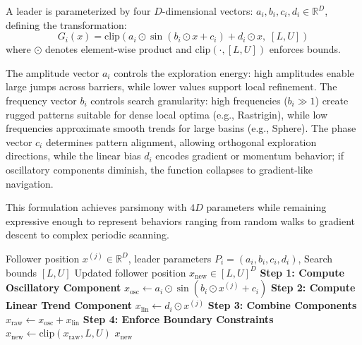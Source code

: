 \documentclass[11pt]{article}
\begin{document}
A leader is parameterized by four $D$-dimensional vectors: $a_i, b_i, c_i, d_i \in \mathbb{R}^D$, defining the transformation:
\begin{equation}
G_i(x) = \text{clip}\left( a_i \odot \sin(b_i \odot x + c_i) + d_i \odot x, \; [L, U] \right)
\label{eq:guidance_detailed}
\end{equation}
where $\odot$ denotes element-wise product and $\text{clip}(\cdot, [L, U])$ enforces bounds.

The amplitude vector $a_i$ controls the exploration energy: high amplitudes enable large jumps across barriers, while lower values support local refinement. The frequency vector $b_i$ controls search granularity: high frequencies ($b_i \gg 1$) create rugged patterns suitable for dense local optima (e.g., Rastrigin), while low frequencies approximate smooth trends for large basins (e.g., Sphere). The phase vector $c_i$ determines pattern alignment, allowing orthogonal exploration directions, while the linear bias $d_i$ encodes gradient or momentum behavior; if oscillatory components diminish, the function collapses to gradient-like navigation.

This formulation achieves parsimony with $4D$ parameters while remaining expressive enough to represent behaviors ranging from random walks to gradient descent to complex periodic scanning.

\begin{algorithm}[h]
\caption{leader Guidance Application}
\label{alg:guidance}
\begin{algorithmic}[1]
\Require Follower position $x^{(j)} \in \mathbb{R}^D$, leader parameters $P_i = (a_i, b_i, c_i, d_i)$, Search bounds $[L, U]$
\Ensure Updated follower position $x_{\text{new}} \in [L, U]^D$
\State \textbf{Step 1: Compute Oscillatory Component}
\State $x_{\text{osc}} \leftarrow a_i \odot \sin(b_i \odot x^{(j)} + c_i)$ 
\State \textbf{Step 2: Compute Linear Trend Component}
\State $x_{\text{lin}} \leftarrow d_i \odot x^{(j)}$ 
\State \textbf{Step 3: Combine Components}
\State $x_{\text{raw}} \leftarrow x_{\text{osc}} + x_{\text{lin}}$ 
\State \textbf{Step 4: Enforce Boundary Constraints}
\State $x_{\text{new}} \leftarrow \text{clip}(x_{\text{raw}}, L, U)$ 
\State \Return $x_{\text{new}}$
\end{algorithmic}
\end{algorithm}
\end{document}
